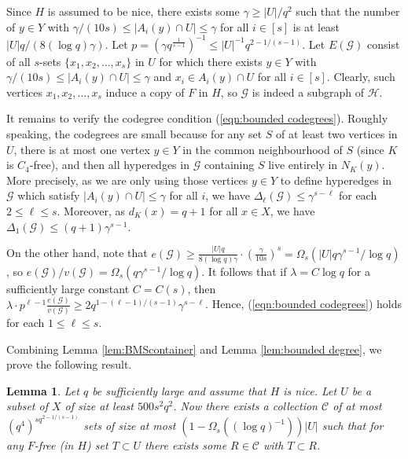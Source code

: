 \documentclass[11pt]{article}
\let\oldendproof\endproof
\renewenvironment{proof}[1][\proofname]{\oldproof[\bf #1]}{\oldendproof}
\theoremstyle{plain}
\newtheorem{lemma}[theorem]{Lemma}
\theoremstyle{definition}
\begin{document}
\begin{proof}
    Since $H$ is assumed to be nice, there exists some $\gamma\geq |U|/q^2$ such that the number of $y\in Y$ with $\gamma/(10s)\leq|A_i(y)\cap U|\leq \gamma$ for all $i\in [s]$ is at least $|U|q/(8(\log q)\gamma)$. Let $p=(\gamma q^{\frac{1}{s-1}})^{-1}\leq |U|^{-1}q^{2-1/(s-1)}$. Let $E(\mathcal{G})$ consist of all $s$-sets $\{x_1,x_2,\dots,x_s\}$ in $U$ for which there exists $y\in Y$ with $\gamma/(10s)\leq|A_i(y)\cap U|\leq \gamma$ and $x_i\in A_i(y)\cap U$ for all $i\in [s]$. Clearly, such vertices $x_1,x_2,\dots,x_s$ induce a copy of $F$ in $H$, so $\mathcal{G}$ is indeed a subgraph of $\mathcal{H}$.

    It remains to verify the codegree condition (\ref{eqn:bounded codegrees}).  Roughly speaking, the codegrees are small because for any set $S$ of at least two vertices in $U$, there is at most one vertex $y\in Y$ in the common neighbourhood of $S$ (since $K$ is $C_4$-free), and then all hyperedges in $\mathcal{G}$ containing $S$ live entirely in $N_K(y)$. More precisely, as we are only using those vertices $y\in Y$ to define hyperedges in $\mathcal{G}$ which satisfy $|A_i(y)\cap U|\leq \gamma$ for all $i$, we have $\Delta_{\ell}(\mathcal{G})\leq \gamma^{s-\ell}$ for each $2\leq \ell\leq s$. 
    Moreover, as $d_K(x)=q+1$ for all $x\in X$, we have $\Delta_1(\mathcal{G})\leq (q+1)\gamma^{s-1}$.

    On the other hand, note that $e(\mathcal{G})\geq \frac{|U|q}{8(\log q)\gamma}\cdot (\frac{\gamma}{10s})^s=\Omega_s(|U|q\gamma^{s-1}/\log q)$, so $e(\mathcal{G})/v(\mathcal{G})=\Omega_s(q\gamma^{s-1}/\log q)$. It follows that if $\lambda=C\log q$ for a sufficiently large constant $C=C(s)$, then $\lambda\cdot p^{\ell-1}\frac{e(\mathcal{G})}{v(\mathcal{G})}\geq 2q^{1-(\ell-1)/(s-1)}\gamma^{s-\ell}$. Hence, (\ref{eqn:bounded codegrees}) holds for each $1\leq \ell\leq s$.
\end{proof}

Combining Lemma \ref{lem:BMScontainer} and Lemma \ref{lem:bounded degree}, we prove the following result.

\begin{lemma} \label{lem:container}
    Let $q$ be sufficiently large and assume that $H$ is nice. Let $U$ be a subset of $X$ of size at least $500s^2q^2$. Now there exists a collection $\mathcal{C}$ of at most $(q^4)^{sq^{2-1/(s-1)}}$ sets of size at most $(1-\Omega_s((\log q)^{-1}))|U|$ such that for any $F$-free (in $H$) set $T\subset U$ there exists some $R\in \mathcal{C}$ with $T\subset R$.
\end{lemma}
\end{document}
